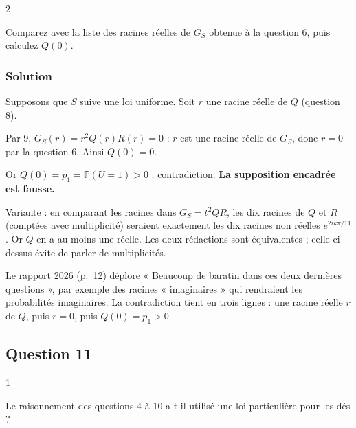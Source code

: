 \documentclass[11pt,a4paper]{article}
\begin{document}
\begin{indication}{2}

Comparez avec la liste des racines réelles de \(G_S\) obtenue à la question 6, puis calculez \(Q(0)\).

\end{indication}

\hypertarget{solution-45}{%
\subsubsection{Solution}\label{solution-45}}

Supposons que \(S\) suive une loi uniforme. Soit \(r\) une racine réelle de \(Q\) (question 8).

Par 9, \(G_S(r)=r^2Q(r)R(r)=0\) : \(r\) est une racine réelle de \(G_S\), donc \(r=0\) par la question 6. Ainsi \(Q(0)=0\).

Or \(Q(0)=p_1=\mathbb P(U=1)>0\) : contradiction. \textbf{La supposition encadrée est fausse.}

\begin{methode}

Variante : en comparant les racines dans \(G_S=t^2QR\), les dix racines de \(Q\) et \(R\) (comptées avec multiplicité) seraient exactement les dix racines non réelles \(e^{2ik\pi/11}\). Or \(Q\) en a au moins une réelle. Les deux rédactions sont équivalentes ; celle ci-dessus évite de parler de multiplicités.

\end{methode}

\begin{jury}

Le rapport 2026 (p.~12) déplore « Beaucoup de baratin dans ces deux dernières questions », par exemple des racines « imaginaires » qui rendraient les probabilités imaginaires. La contradiction tient en trois lignes : une racine réelle \(r\) de \(Q\), puis \(r=0\), puis \(Q(0)=p_1>0\).

\end{jury}

\hypertarget{question-11-1}{%
\subsection{Question 11}\label{question-11-1}}

\begin{indication}{1}

Le raisonnement des questions 4 à 10 a-t-il utilisé une loi particulière pour les dés ?

\end{indication}
\end{document}
